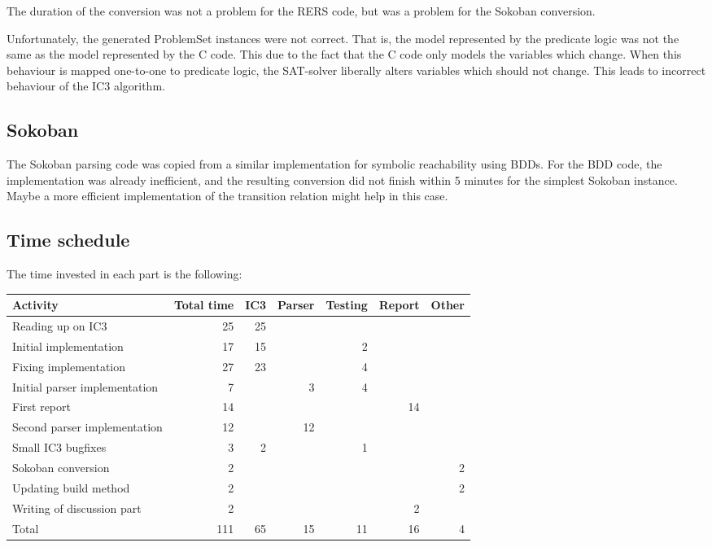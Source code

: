 \documentclass[a4paper]{article}
\begin{document}
The duration of the conversion was not a problem for the RERS code, but was a problem for the Sokoban conversion.

Unfortunately, the generated ProblemSet instances were not correct.
That is, the model represented by the predicate logic was not the same as the model represented by the C code. This due to the fact that the C code only models the variables which change. When this behaviour is mapped one-to-one to predicate logic, the SAT-solver liberally alters variables which should not change. This leads to incorrect behaviour of the IC3 algorithm.

\subsection{Sokoban}
The Sokoban parsing code was copied from a similar implementation for symbolic reachability using BDDs. For the BDD code, the implementation was already inefficient, and the resulting conversion did not finish within 5 minutes for the simplest Sokoban instance. Maybe a more efficient implementation of the transition relation might help in this case.

\subsection{Time schedule}
The time invested in each part is the following:

\begin{tabularx}{\linewidth}{X|rrrrrr}
Activity                      & Total time & IC3 & Parser & Testing & Report & Other \\\hline
Reading up on IC3             & 25         & 25  &        &         &        &       \\
Initial implementation        & 17         & 15  &        & 2       &        &       \\
Fixing implementation         & 27         & 23  &        & 4       &        &       \\
Initial parser implementation & 7          &     & 3      & 4       &        &       \\
First report                  & 14         &     &        &         & 14     &       \\
Second parser implementation  & 12         &     & 12     &         &        &       \\
Small IC3 bugfixes            & 3          & 2   &        & 1       &        &       \\
Sokoban conversion            & 2          &     &        &         &        & 2     \\
Updating build method         & 2          &     &        &         &        & 2     \\
Writing of discussion part    & 2          &     &        &         & 2      &       \\\hline
Total                         & 111        & 65  & 15     & 11      & 16     & 4    
\end{tabularx}
\end{document}
